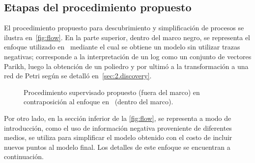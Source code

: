 \subsection{Etapas del procedimiento propuesto}
\label{sec:3.algodisco stages}

El procedimiento propuesto para descubrimiento y simplificación de procesos se ilustra en~\autoref{fig:flow}.
En la parte superior, dentro del marco negro, se representa el enfoque utilizado en~\cite{CarmonaC14} 
mediante el cual se obtiene un modelo sin utilizar trazas negativas; corresponde a la interpretación
de un log como un conjunto de vectores Parikh, luego la obtención de un poliedro y por ultimó a la 
transformación a una red de Petri según se detalló en~\autoref{sec:2.discovery}.

\begin{figure}[H]
    \begin{center}
    \caption{Procedimiento supervisado propuesto (fuera del marco) en contraposición al enfoque
        en~\cite{CarmonaC14} (dentro del marco).}
    \label{fig:flow}
    \end{center}
\end{figure}

Por otro lado, en la sección inferior de la \autoref{fig:flow}, se representa a modo de introducción,
como el uso de información negativa proveniente de diferentes medios, se utiliza para simplificar 
el modelo obtenido con el costo de incluir nuevos puntos al modelo final.
Los detalles de este enfoque se encuentran a continuación.

